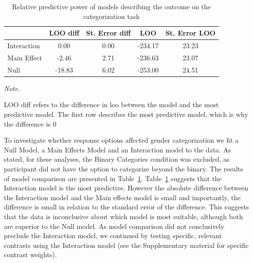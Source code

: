 \documentclass[
  man]{apa7}
\begin{document}
\begin{table}

\caption{\label{tab:loo}Relative predictive power of models describing the outcome on the categorization task}
\centering
\begin{threeparttable}
\begin{tabular}[t]{lcccc}
\toprule
  & LOO diff & St. Error diff & LOO & St. Error LOO\\
\midrule
Interaction & 0.00 & 0.00 & -234.17 & 23.23\\
Main Effect & -2.46 & 2.71 & -236.63 & 23.07\\
Null & -18.83 & 6.02 & -253.00 & 24.51\\
\bottomrule
\end{tabular}
\begin{tablenotes}[para]
\item \textit{Note.} 
\item LOO diff refers to the difference in loo between the model and the most predictive model. The first row describes the most predictive model, which is why the difference is 0
\end{tablenotes}
\end{threeparttable}
\end{table}

To investigate whether response options affected gender categorization we fit a Null Model, a Main Effects Model and an Interaction model to the data. As stated, for these analyses, the Binary Categories condition was excluded, as participant did not have the option to categorize beyond the binary. The results of model comparison are presented in Table~\ref{tab:loo}.
Table~\ref{tab:loo} suggests that the Interaction model is the most predictive. However the absolute difference between the Interaction model and the Main effects model is small and importantly, the difference is small in relation to the standard error of the difference. This suggests that the data is inconclusive about which model is most suitable, although both are superior to the Null model. As model comparison did not conclusively preclude the Interaction model, we continued by testing specific, relevant contrasts using the Interaction model (see the Supplementary material for specific contrast weights).
\end{document}
